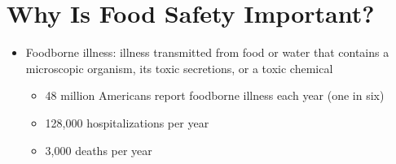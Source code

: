 \documentclass[title={Chapter 12}]{fdsn201notes}
\begin{document}
%
%
%

\section{Why Is Food Safety Important?}\label{sec:why-is-food-safety-important?}
\begin{itemize}
	\item Foodborne illness: illness transmitted from food or water that contains a microscopic organism, its toxic secretions, or a toxic chemical
	\begin{itemize}
		\item 48 million Americans report foodborne illness each year (one in six)
		\item 128,000 hospitalizations per year
		\item 3,000 deaths per year
	\end{itemize}
\end{itemize}
\end{document}
